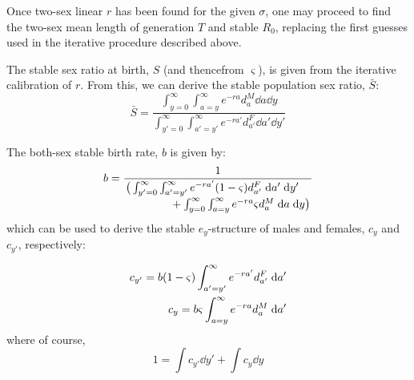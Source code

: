  \FloatBarrier
\label{sec:2sexlinearother}
Once two-sex linear $r$ has been found for the given $\sigma$, one may
proceed to find the two-sex mean length of generation $T$ and stable $R_0$,
replacing the first guesses used in the iterative procedure described above.

The stable sex ratio at birth, $S$ (and thencefrom $\varsigma$), is given from
the iterative calibration of $r$. From this, we can derive the stable
population sex ratio, $\bar{S}$:
\begin{equation}
\bar{S} = \frac{ \int_{y=0}^\infty \int_{a=y}^\infty e^{-ra} d_{a}^M \dd a \dd
y}{\int_{y'=0}^\infty \int_{a'=y'}^\infty e^{-ra'} d_{a'}^F \dd a' \dd
y'}
\end{equation}

The both-sex stable birth rate, $b$ is given by:
\begin{equation}
b = \frac{1}{
            \splitfrac{\big( \int _{y'=0}^\infty
            \int _{a'=y'}^\infty e^{-r a'} (1-\varsigma) d_{a'}^F \dd a' \dd
            y'}{ + \int _{y=0}^\infty \int _{a=y}^\infty
             e^{-r a} \varsigma d_{a}^M \dd a \dd y\big)}  }                   
\end{equation}
which can be used to derive the stable $e_y$-structure of males and females,
$c_y$ and $c_{y'}$, respectively:

\begin{align}
c_{y'} = b (1-\varsigma) \int _{a'=y'}^\infty
e^{-ra'} d_{a'}^F \; \mathrm{d} a' \notag \\
c_{y} = b \varsigma \int _{a=y}^\infty
e^{-ra} d_{a}^M \; \mathrm{d} a'
\label{eq:stablecy}
\end{align}
where of course,
\begin{equation}
1 = \int c_{y'} \dd y' + \int c_{y} \dd y
\end{equation}
